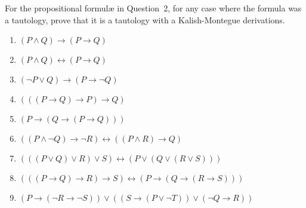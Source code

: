 \documentclass[10.5pt]{article}
\newenvironment{problem}[2][Problem]{\begin{trivlist}
\item[\hskip \labelsep {\bfseries #1}\hskip \labelsep {\bfseries #2.}]}{\end{trivlist}}
\begin{document}
\begin{problem}{4} For the propositional formul{\ae} in Question~2, for any case where the formula was a tautology, prove that it is a tautology with a Kalish-Montegue derivations.
\begin{enumerate}
  \parskip=0in
  \parsep=0in
  \itemsep=0in
\item $(P \wedge Q) \rightarrow (P \rightarrow Q)$
\item $(P \wedge Q) \leftrightarrow (P \rightarrow Q)$
\item $(\lnot P \vee Q) \rightarrow (P \rightarrow \lnot Q)$
\item $(((P \rightarrow Q) \rightarrow P) \rightarrow Q)$
\item $(P \rightarrow (Q \rightarrow (P \rightarrow Q)))$
\item $((P \wedge \lnot Q) \rightarrow \lnot R) \leftrightarrow ((P \wedge R) \rightarrow Q)$
\item $(((P \vee Q) \vee R) \vee S) \leftrightarrow (P \vee (Q \vee (R \vee S)))$
\item $(((P \rightarrow Q) \rightarrow R) \rightarrow S) \leftrightarrow (P \rightarrow (Q \rightarrow (R \rightarrow S)))$
\item $(P \rightarrow (\lnot R \rightarrow \lnot S)) \vee ((S \rightarrow (P \vee \lnot T)) \vee (\lnot Q \rightarrow R))$
\end{enumerate}
\end{problem}
\end{document}
